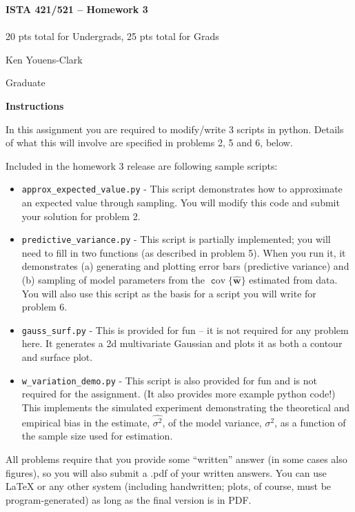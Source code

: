 \documentclass[10pt]{article}
\newcommand{\latex}{\LaTeX\xspace}
\DeclareMathOperator{\cov}{\texttt cov}
\begin{document}
\begin{center}
    {\Large {\bf ISTA 421/521 -- Homework 3}} \\
     \\
    20 pts total for Undergrads, 25 pts total for Grads
    
\end{center}

\begin{flushright}
Ken Youens-Clark

Graduate 
\end{flushright}

\vspace{1cm}
{\Large {\bf Instructions}}

In this assignment you are required to modify/write 3 scripts in python.  Details of what this will involve are specified in problems 2, 5 and 6, below.

Included in the homework 3 release are following sample scripts:
\begin{itemize}
\item {\tt approx\_expected\_value.py} - This script demonstrates how to approximate an expected value through sampling.  You will modify this code and submit your solution for problem 2.
\item {\tt predictive\_variance.py} - This script is partially implemented; you will need to fill in two functions (as described in problem 5).  When you run it, it demonstrates (a) generating and plotting error bars (predictive variance) and (b) sampling of model parameters from the $\cov\{\widehat{\mathbf{w}}\}$ estimated from data.  You will also use this script as the basis for a script you will write for problem 6.
\item {\tt gauss\_surf.py} - This is provided for fun -- it is not required for any problem here.  It generates a 2d multivariate Gaussian and plots it as both a contour and surface plot.
\item {\tt w\_variation\_demo.py} - This script is also provided for fun and is not required for the assignment. (It also provides more example python code!)  This implements the simulated experiment demonstrating the theoretical and empirical bias in the estimate, $\widehat{\sigma^2}$, of the model variance, $\sigma^2$, as a function of the sample size used for estimation.
\end{itemize}

All problems require that you provide some ``written'' answer (in some cases also figures), so you will also submit a .pdf of your written answers.  You can use \latex or any other system (including handwritten; plots, of course, must be program-generated) as long as the final version is in PDF.
\end{document}
